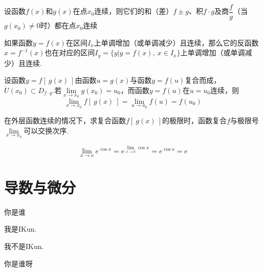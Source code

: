 \documentclass[lang=cn,10pt]{elegantbook}
\begin{document}
\begin{theorem}
	设函数\( f(x) \)和\( g(x) \)在点\( x_{0} \)连续，则它们的和（差）\( f \pm g \)、积\( f \cdot g \)及商\( \dfrac{f}{g} \)（当\( g(x_{0}) \neq 0 \)时）都在点\( x_{0} \)连续
\end{theorem}

\begin{theorem}
	如果函数\( y = f(x) \)在区间\( I_{x} \)上单调增加（或单调减少）且连续，那么它的反函数\( x = f^{-1}(x) \)也在对应的区间\( I_{y} = \{y | y = f(x),\ x\in I_{x}\} \)上单调增加（或单调减少）且连续.
\end{theorem}

\begin{theorem}
	设函数\( y =f[\ g(x)\ ] \)由函数\( u = g(x) \)与函数\( y = f(u) \)复合而成，\( \mathring{U}(x_{0}) \subset D_{f \cdot g} \).若\( \lim\limits_{x \to x_{0}}g(x_{0}) = u_{0} \)，而函数\( y = f(u) \)在\( u = u_{0} \)连续，则
	\[ \lim\limits_{x \to x_{0}}f[\ g(x)\ ] = \lim\limits_{u \to u_{0}}f(u) = f(u_{0}) \]
\end{theorem}

\begin{note}
	在外层函数连续的情况下，求复合函数\( f[\ g(x)\ ] \)的极限时，函数复合\( f \)与极限号\( \lim\limits_{x \to x_{0}} \)可以交换次序.
	\begin{example}
		\[ \lim\limits_{x \to o}e^{\cos x} = e^{\lim\limits_{x \to 0}\cos x} = e^{\cos o} = e \]
	\end{example}
\end{note}






\chapter{导数与微分}

\begin{problemset}[错题集]
	\item 你是谁\adftripleflourishright
\end{problemset}

\begin{conclusion}
	我是IKun.
\end{conclusion}

\begin{assumption}
	我不是IKun.
\end{assumption}

\begin{property}
	你是谁呀
\end{property}
\end{document}
